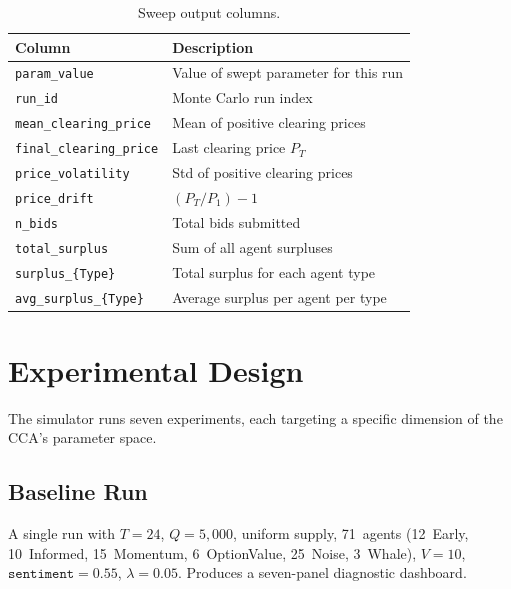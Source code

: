 \documentclass[11pt,a4paper]{article}
\begin{document}
\begin{table}[h]
\centering
\caption{Sweep output columns.}
\label{tab:sweep-cols}
\begin{tabular}{@{}ll@{}}
\toprule
\textbf{Column} & \textbf{Description} \\
\midrule
\texttt{param\_value}          & Value of swept parameter for this run \\
\texttt{run\_id}               & Monte Carlo run index \\
\texttt{mean\_clearing\_price} & Mean of positive clearing prices \\
\texttt{final\_clearing\_price}& Last clearing price $P_T$ \\
\texttt{price\_volatility}     & Std of positive clearing prices \\
\texttt{price\_drift}          & $(P_T / P_1) - 1$ \\
\texttt{n\_bids}               & Total bids submitted \\
\texttt{total\_surplus}        & Sum of all agent surpluses \\
\texttt{surplus\_\{Type\}}     & Total surplus for each agent type \\
\texttt{avg\_surplus\_\{Type\}}& Average surplus per agent per type \\
\bottomrule
\end{tabular}
\end{table}


\section{Experimental Design}
\label{sec:experiments}

The simulator runs seven experiments, each targeting a specific dimension of the CCA's parameter space.

\subsection{Baseline Run}
\label{sec:exp-baseline}

A single run with $T = 24$, $Q = 5{,}000$, uniform supply, 71~agents (12~Early, 10~Informed, 15~Momentum, 6~OptionValue, 25~Noise, 3~Whale), $V = 10$, $\texttt{sentiment} = 0.55$, $\lambda = 0.05$.  Produces a seven-panel diagnostic dashboard.

\end{document}
